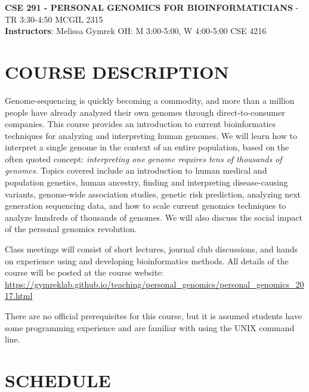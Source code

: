 \documentclass[12pt]{article}
\begin{document}
\textbf{CSE 291 - PERSONAL GENOMICS FOR BIOINFORMATICIANS} - TR 3:30-4:50 MCGIL 2315 \\
\textbf{Instructors}: Melissa Gymrek OH: M 3:00-5:00, W 4:00-5:00 CSE 4216 \\

\section*{COURSE DESCRIPTION}
Genome-sequencing is quickly becoming a commodity, and more than a million people have already analyzed their own genomes through direct-to-consumer companies. This course provides an introduction to current bioinformatics techniques for analyzing and interpreting human genomes. We will learn how to interpret a single genome in the context of an entire population, based on the often quoted concept: \emph{interpreting one genome requires tens of thousands of genomes}. Topics covered include an introduction to human medical and population genetics, human ancestry, finding and interpreting disease-causing variants, genome-wide association studies, genetic risk prediction, analyzing next generation sequencing data, and how to scale current genomics techniques to analyze hundreds of thousands of genomes. We will also discuss the social impact of the personal genomics revolution.

Class meetings will consist of short lectures, journal club discussions, and hands on experience using and developing bioinformatics methods. All details of the course will be posted at the course website:\\
\href{https://gymreklab.github.io/teaching/personal\_genomics/personal\_genomics_2017.html}{https://gymreklab.github.io/teaching/personal\_genomics/personal\_genomics\_2017.html}

There are no official prerequisites for this course, but it is assumed students have some programming experience and are familiar with using the UNIX command line.




\section*{SCHEDULE}
\end{document}
